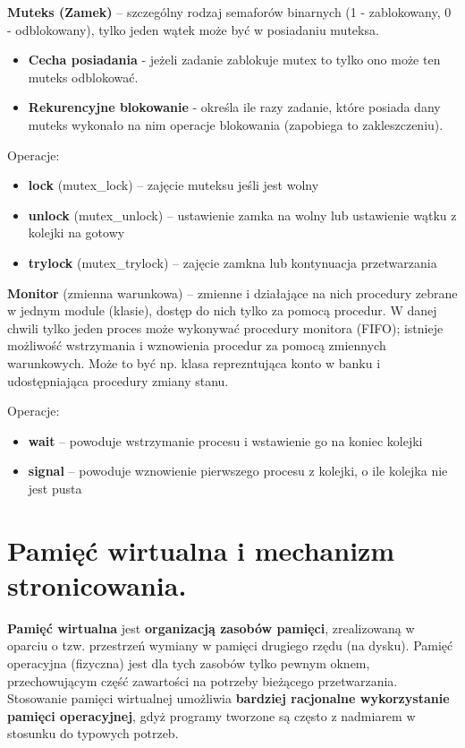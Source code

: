 \documentclass[main.tex]{subfiles}
\begin{document}
    \noindent \textbf{Muteks (Zamek)} -- szczególny rodzaj semaforów binarnych (1 - zablokowany, 0 - odblokowany), tylko
    jeden wątek może być w posiadaniu muteksa.

    \begin{itemize}[noitemsep]
        \item \textbf{Cecha posiadania} - jeżeli zadanie zablokuje mutex to tylko ono może ten muteks odblokować.
        \item \textbf{Rekurencyjne blokowanie} - określa ile razy zadanie, które posiada dany muteks wykonało na nim
        operacje blokowania (zapobiega to zakleszczeniu).
    \end{itemize}

    \noindent Operacje:
    \begin{itemize}[noitemsep]
        \item \textbf{lock} (mutex\_lock) -- zajęcie muteksu jeśli jest wolny
        \item \textbf{unlock} (mutex\_unlock) -- ustawienie zamka na wolny lub ustawienie wątku z kolejki na gotowy
        \item \textbf{trylock} (mutex\_trylock) -- zajęcie zamkna lub kontynuacja przetwarzania
    \end{itemize}

    \noindent \textbf{Monitor} (zmienna warunkowa) -- zmienne i działające na nich procedury zebrane w jednym module
    (klasie), dostęp do nich tylko za pomocą procedur. W danej chwili tylko jeden proces może wykonywać procedury
    monitora (FIFO); istnieje możliwość wstrzymania i wznowienia procedur za pomocą zmiennych warunkowych.
    Może to być np. klasa reprezntująca konto w banku i udostępniająca procedury zmiany stanu.

    \noindent Operacje:
    \begin{itemize}[noitemsep]
        \item \textbf{wait} -- powoduje wstrzymanie procesu i wstawienie go na koniec kolejki
        \item \textbf{signal} -- powoduje wznowienie pierwszego procesu z kolejki, o ile kolejka nie jest pusta
    \end{itemize}


    \section{Pamięć wirtualna i mechanizm stronicowania.}

    \textbf{Pamięć wirtualna} jest \textbf{organizacją zasobów pamięci}, zrealizowaną w oparciu o tzw. przestrzeń
    wymiany w pamięci drugiego rzędu (na dysku). Pamięć operacyjna (fizyczna) jest dla tych zasobów tylko pewnym oknem,
    przechowującym część zawartości na potrzeby bieżącego przetwarzania. Stosowanie pamięci wirtualnej umożliwia
    \textbf{bardziej racjonalne wykorzystanie pamięci operacyjnej}, gdyż programy tworzone są często z nadmiarem
    w stosunku do typowych potrzeb.\\
\end{document}
